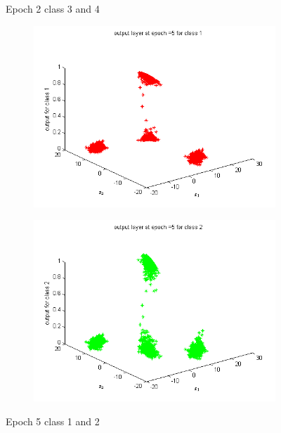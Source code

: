 \documentclass{article}
\begin{document}
\begin{flushleft}
\begin{figure}
\begin{subfigure}{.5\textwidth}
\end{subfigure}
\caption{Epoch 2 class 3 and 4}
\end{figure}

\begin{figure}
\begin{subfigure}{.5\textwidth}
  \centering
  \includegraphics[width=.8\linewidth]{Classification/linearlySeparable/5_1}
 
\end{subfigure}%
\begin{subfigure}{.5\textwidth}
  \centering
  \includegraphics[width=.8\linewidth]{Classification/linearlySeparable/5_2}
  
\end{subfigure}
\caption{Epoch 5 class 1 and 2}
\end{figure}


\end{flushleft}
\end{document}

